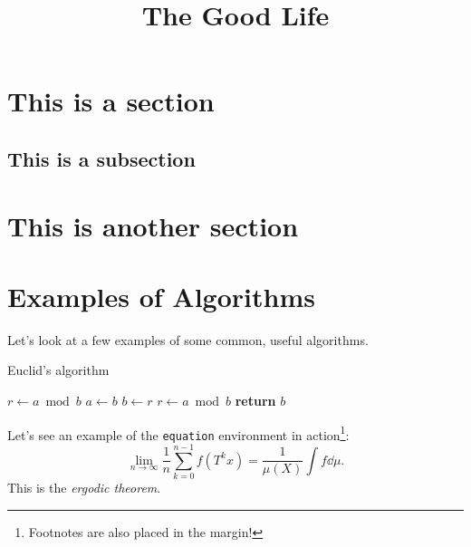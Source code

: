 \documentclass[code]{notes}
\title{The Good Life}
\begin{document}
	\section{This is a section}
	\kant[1]
	\subsection{This is a subsection}
	\kant[2-4]
	\section{This is another section}
	\kant[5-7]
	\section{Examples of Algorithms}
	Let's look at a few examples of some common, useful algorithms.
	\begin{algorithm}
	    \caption{Euclid’s algorithm}
	    \label{euclid}
	    \begin{algorithmic}[1] %
	         
	            \State $r\gets a \bmod b$
	             
	                \State $a \gets b$
	                \State $b \gets r$
	                \State $r \gets a \bmod b$
	            \EndWhile\label{euclidendwhile}
	            \State \textbf{return} $b$
	        \EndProcedure
	    \end{algorithmic}
	\end{algorithm}
	\kant[8]
	Let's see an example of the \texttt{equation} environment in action\footnote{Footnotes are also placed in the margin!}:
	\begin{equation}
		\lim_{n\to\infty} \frac{1}{n} \sum_{k=0}^{n-1} f(T^k x) = \frac{1}{\mu(X)} \int f \dd{\mu}.
	\end{equation}
	This is the \emph{ergodic theorem}. \kant[2]
\end{document}
